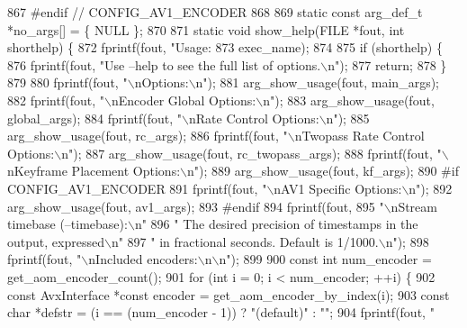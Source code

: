 \begin{DoxyCodeInclude}
{{{{{{{867 \textcolor{preprocessor}{#endif  // CONFIG\_AV1\_ENCODER}
868 
869 \textcolor{keyword}{static} \textcolor{keyword}{const} arg\_def\_t *no\_args[] = \{ NULL \};
870 
871 \textcolor{keyword}{static} \textcolor{keywordtype}{void} show\_help(FILE *fout, \textcolor{keywordtype}{int} shorthelp) \{
872   fprintf(fout, \textcolor{stringliteral}{"Usage: %
873           exec\_name);
874 
875   \textcolor{keywordflow}{if} (shorthelp) \{
876     fprintf(fout, \textcolor{stringliteral}{"Use --help to see the full list of options.\(\backslash\)n"});
877     \textcolor{keywordflow}{return};
878   \}
879 
880   fprintf(fout, \textcolor{stringliteral}{"\(\backslash\)nOptions:\(\backslash\)n"});
881   arg\_show\_usage(fout, main\_args);
882   fprintf(fout, \textcolor{stringliteral}{"\(\backslash\)nEncoder Global Options:\(\backslash\)n"});
883   arg\_show\_usage(fout, global\_args);
884   fprintf(fout, \textcolor{stringliteral}{"\(\backslash\)nRate Control Options:\(\backslash\)n"});
885   arg\_show\_usage(fout, rc\_args);
886   fprintf(fout, \textcolor{stringliteral}{"\(\backslash\)nTwopass Rate Control Options:\(\backslash\)n"});
887   arg\_show\_usage(fout, rc\_twopass\_args);
888   fprintf(fout, \textcolor{stringliteral}{"\(\backslash\)nKeyframe Placement Options:\(\backslash\)n"});
889   arg\_show\_usage(fout, kf\_args);
890 \textcolor{preprocessor}{#if CONFIG\_AV1\_ENCODER}
891   fprintf(fout, \textcolor{stringliteral}{"\(\backslash\)nAV1 Specific Options:\(\backslash\)n"});
892   arg\_show\_usage(fout, av1\_args);
893 \textcolor{preprocessor}{#endif}
894   fprintf(fout,
895           \textcolor{stringliteral}{"\(\backslash\)nStream timebase (--timebase):\(\backslash\)n"}
896           \textcolor{stringliteral}{"  The desired precision of timestamps in the output, expressed\(\backslash\)n"}
897           \textcolor{stringliteral}{"  in fractional seconds. Default is 1/1000.\(\backslash\)n"});
898   fprintf(fout, \textcolor{stringliteral}{"\(\backslash\)nIncluded encoders:\(\backslash\)n\(\backslash\)n"});
899 
900   \textcolor{keyword}{const} \textcolor{keywordtype}{int} num\_encoder = get\_aom\_encoder\_count();
901   \textcolor{keywordflow}{for} (\textcolor{keywordtype}{int} i = 0; i < num\_encoder; ++i) \{
902     \textcolor{keyword}{const} AvxInterface *\textcolor{keyword}{const} encoder = get\_aom\_encoder\_by\_index(i);
903     \textcolor{keyword}{const} \textcolor{keywordtype}{char} *defstr = (i == (num\_encoder - 1)) ? \textcolor{stringliteral}{"(default)"} : \textcolor{stringliteral}{""};
904     fprintf(fout, \textcolor{stringliteral}{"    %
}}}}}}}}}
\end{DoxyCodeInclude}
